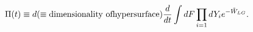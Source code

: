 \begin{equation}
\label{eq:periodieuf}
\Pi(t)\equiv d(\equiv{\rm dimensionality\ of hypersurface})
{d\over dt}\int dF\prod_{i=1} dY_i e^{-\tilde{W}_{LG}}.
\end{equation}

